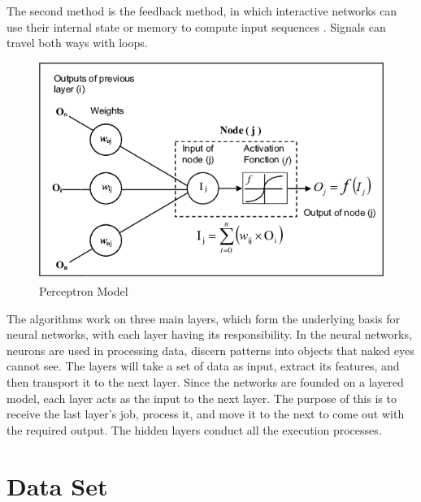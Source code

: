 \documentclass[10pt,conference,a4paper]{IEEEtran}
\begin{document}
The second method is the feedback method, in which interactive networks can use their internal state or memory to compute input sequences \cite{yang2020}. Signals can travel both ways with loops. 

\begin{figure}[h]
    \centering
    \includegraphics[width=0.9\columnwidth]{neural network node.png}
    \caption{Perceptron Model}
    \label{fig:Neural Network Node}
\end{figure}

The algorithms work on three main layers, which form the underlying basis for neural networks, with each layer having its responsibility. In the neural networks, neurons are used in processing data, discern patterns into objects that naked eyes cannot see. The layers will take a set of data as input, extract its features, and then transport it to the next layer. Since the networks are founded on a layered model, each layer acts as the input to the next layer. The purpose of this is to receive the last layer’s job, process it, and move it to the next to come out with the required output. The hidden layers conduct all the execution processes\cite{yang2020}. 

\section{Data Set}
\label{data_set}
\end{document}

